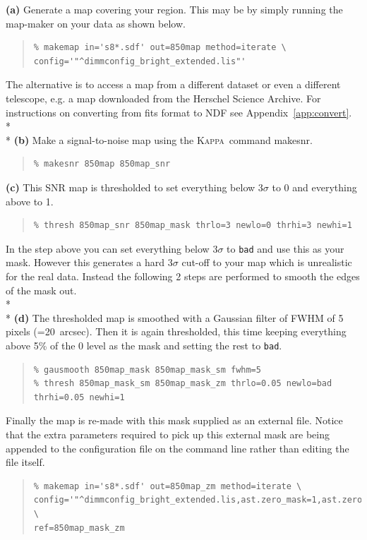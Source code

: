 \documentclass[twoside,11pt]{article}
\newcommand{\htmlref}[2]{#1}
\newcommand{\latexhtml}[2]{#1}
\newcommand{\xref}[3]{#1}
\renewcommand{\_}{\texttt{\symbol{95}}}
\newenvironment{myquote}{\begin{quote}\begin{small}}{\end{small}\end{quote}}
\newcommand{\Kappa}{\xref{\textsc{Kappa}}{sun95}{}}
\newcommand{\task}[1]{\textsf{#1}}
\newcommand{\makesnr}{\xref{\task{makesnr}}{sun95}{MAKESNR}}
\newcommand{\cref}[3]{\latexhtml{#1~\ref{#2}}{\htmlref{#3}{#2}}}
\begin{document}
\textbf{(a)} Generate a map covering your region. This may be by simply
running the map-maker on your data as shown below.
\begin{myquote}
\begin{verbatim}
% makemap in='s8*.sdf' out=850map method=iterate \
config='"^dimmconfig_bright_extended.lis"'
\end{verbatim}
\end{myquote}
The alternative is to access a map from a different dataset or even a
different telescope, e.g. a map downloaded from the Herschel Science
Archive. For instructions on converting from fits format to NDF see
\cref{Appendix}{app:convert}{this appendix}.
\\*\\*
\textbf{(b)} Make a signal-to-noise map using the \Kappa\ command \makesnr.
\begin{myquote}
\begin{verbatim}
% makesnr 850map 850map_snr
\end{verbatim}
\end{myquote}
\textbf{(c)} This SNR map is thresholded to set everything below 3$\sigma$ to 0 and
everything above to 1.
\begin{myquote}
\begin{verbatim}
% thresh 850map_snr 850map_mask thrlo=3 newlo=0 thrhi=3 newhi=1
\end{verbatim}
\end{myquote}
In the step above you can set everything below 3$\sigma$ to
\texttt{bad} and use this as your mask. However this generates a hard
3$\sigma$ cut-off to your map which is unrealistic for the real data.
Instead the following 2 steps are performed to smooth the edges of the
mask out.
\\*\\*
\textbf{(d)} The thresholded map is smoothed with a Gaussian filter
of FWHM of 5 pixels (=20~arcsec). Then it is again thresholded, this time
keeping everything above 5\% of the 0 level as the mask and setting
the rest to \texttt{bad}.
\begin{myquote}
\begin{verbatim}
% gausmooth 850map_mask 850map_mask_sm fwhm=5
% thresh 850map_mask_sm 850map_mask_zm thrlo=0.05 newlo=bad thrhi=0.05 newhi=1
\end{verbatim}
\end{myquote}
Finally the map is re-made with this mask supplied as an external
file. Notice that the extra parameters required to pick up this external
mask are being appended to the configuration file on the command line
rather than editing the file itself.
\begin{myquote}
\begin{verbatim}
% makemap in='s8*.sdf' out=850map_zm method=iterate \
config='"^dimmconfig_bright_extended.lis,ast.zero_mask=1,ast.zero_snr=0"' \
ref=850map_mask_zm
\end{verbatim}
\end{myquote}
\end{document}
